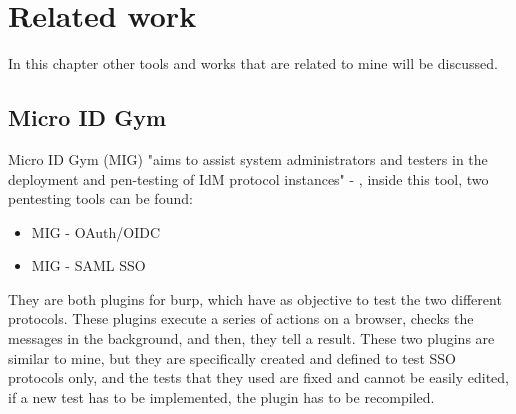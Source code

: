 \chapter{Related work}
\label{chap:Related_work}
In this chapter other tools and works that are related to mine will be discussed.

\section{Micro ID Gym}
Micro ID Gym (MIG) "aims to assist system administrators and testers in the deployment and pen-testing of IdM protocol instances" - \cite{micro_id_gym}, inside this tool, two pentesting tools can be found:
\begin{itemize}
    \item MIG - OAuth/OIDC \cite{claudio_grisenti}
    \item MIG - SAML SSO \cite{stefano_facchini}
\end{itemize}
They are both plugins for \Gls{burp}, which have as objective to test the two different protocols. These plugins execute a series of actions on a browser, checks the messages in the background, and then, they tell a result.
These two plugins are similar to mine, but they are specifically created and defined to test SSO protocols only, and the tests that they used are fixed and cannot be easily edited, if a new test has to be implemented, the plugin has to be recompiled.

